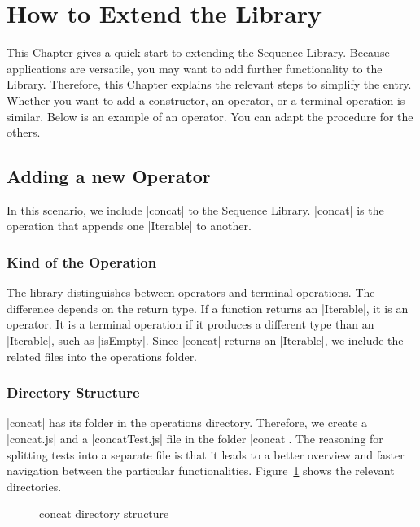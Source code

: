 \section{How to Extend the Library}
\label{sec:How to Extend the Library}
This Chapter gives a quick start to extending the Sequence Library. Because
applications are versatile, you may want to add further functionality to the
Library. Therefore, this Chapter explains the relevant steps to simplify the entry.
\newline
Whether you want to add a constructor, an operator, or a terminal operation is
similar. Below is an example of an operator. You can adapt the procedure for
the others.

\subsection{Adding a new Operator}
\label{sub:Adding a new Operator}
In this scenario, we include |concat| to the Sequence Library. |concat| is the
operation that appends one |Iterable| to another.

\subsubsection{Kind of the Operation}
The library distinguishes between operators and terminal operations. The
difference depends on the return type. If a function returns an |Iterable|, it
is an operator. It is a terminal operation if it produces a different type than an
|Iterable|, such as |isEmpty|.
Since |concat| returns an |Iterable|, we include the related files into the
operations folder.

\subsubsection{Directory Structure}
\label{subsub:Directory Structure}
|concat| has its folder in the operations directory. Therefore, we create a
|concat.js| and a |concatTest.js| file in the folder |concat|. The reasoning for 
splitting tests into a separate file is that it leads to a better overview and faster
navigation between the particular functionalities. Figure~\ref{fig:concat_dir}
shows the relevant directories.

\begin{figure}[H]
  \caption{concat directory structure}
  \label{fig:concat_dir}
\end{figure}

